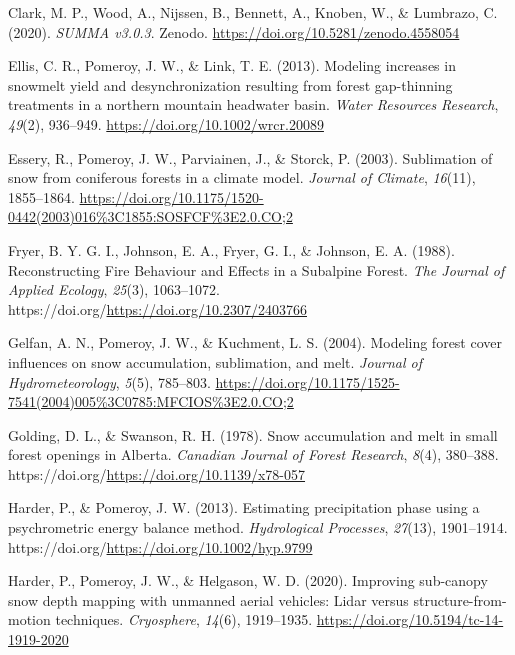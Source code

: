 \documentclass[
  letterpaper,
  DIV=11,
  numbers=noendperiod]{scrartcl}
\newlength{\cslhangindent}
\newenvironment{CSLReferences}[2] %
 {\begin{list}{}{%
  \setlength{\itemindent}{0pt}
  \setlength{\leftmargin}{0pt}
  \setlength{\parsep}{0pt}
  \ifodd #1
   \setlength{\leftmargin}{\cslhangindent}
   \setlength{\itemindent}{-1\cslhangindent}
  \fi
  \setlength{\itemsep}{#2\baselineskip}}}
 {\end{list}}
\begin{document}
\begin{CSLReferences}{1}{0}
Clark, M. P., Wood, A., Nijssen, B., Bennett, A., Knoben, W., \&
Lumbrazo, C. (2020). \emph{{SUMMA v3.0.3}}. Zenodo.
\url{https://doi.org/10.5281/zenodo.4558054}

Ellis, C. R., Pomeroy, J. W., \& Link, T. E. (2013). {Modeling increases
in snowmelt yield and desynchronization resulting from forest
gap-thinning treatments in a northern mountain headwater basin}.
\emph{Water Resources Research}, \emph{49}(2), 936--949.
\url{https://doi.org/10.1002/wrcr.20089}

Essery, R., Pomeroy, J. W., Parviainen, J., \& Storck, P. (2003).
{Sublimation of snow from coniferous forests in a climate model}.
\emph{Journal of Climate}, \emph{16}(11), 1855--1864.
\url{https://doi.org/10.1175/1520-0442(2003)016\%3C1855:SOSFCF\%3E2.0.CO;2}

Fryer, B. Y. G. I., Johnson, E. A., Fryer, G. I., \& Johnson, E. A.
(1988). {Reconstructing Fire Behaviour and Effects in a Subalpine
Forest}. \emph{The Journal of Applied Ecology}, \emph{25}(3),
1063--1072. https://doi.org/\url{https://doi.org/10.2307/2403766}

Gelfan, A. N., Pomeroy, J. W., \& Kuchment, L. S. (2004). {Modeling
forest cover influences on snow accumulation, sublimation, and melt}.
\emph{Journal of Hydrometeorology}, \emph{5}(5), 785--803.
\url{https://doi.org/10.1175/1525-7541(2004)005\%3C0785:MFCIOS\%3E2.0.CO;2}

Golding, D. L., \& Swanson, R. H. (1978). {Snow accumulation and melt in
small forest openings in Alberta}. \emph{Canadian Journal of Forest
Research}, \emph{8}(4), 380--388.
https://doi.org/\url{https://doi.org/10.1139/x78-057}

Harder, P., \& Pomeroy, J. W. (2013). {Estimating precipitation phase
using a psychrometric energy balance method}. \emph{Hydrological
Processes}, \emph{27}(13), 1901--1914.
https://doi.org/\url{https://doi.org/10.1002/hyp.9799}

Harder, P., Pomeroy, J. W., \& Helgason, W. D. (2020). {Improving
sub-canopy snow depth mapping with unmanned aerial vehicles: Lidar
versus structure-from-motion techniques}. \emph{Cryosphere},
\emph{14}(6), 1919--1935. \url{https://doi.org/10.5194/tc-14-1919-2020}


\end{CSLReferences}
\end{document}
